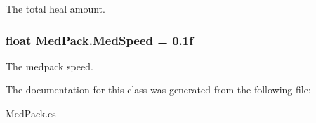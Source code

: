 The total heal amount. 

\hypertarget{classMedPack_a054a06495e6562f93eaeefed24d1d474}{
\subsubsection[{Med\-Speed}]{\setlength{\rightskip}{0pt plus 5cm}float Med\-Pack.\-Med\-Speed = 0.\-1f}}\label{classMedPack_a054a06495e6562f93eaeefed24d1d474}


The medpack speed. 



The documentation for this class was generated from the following file\-:\begin{DoxyCompactItemize}
\item 
Med\-Pack.\-cs\end{DoxyCompactItemize}
